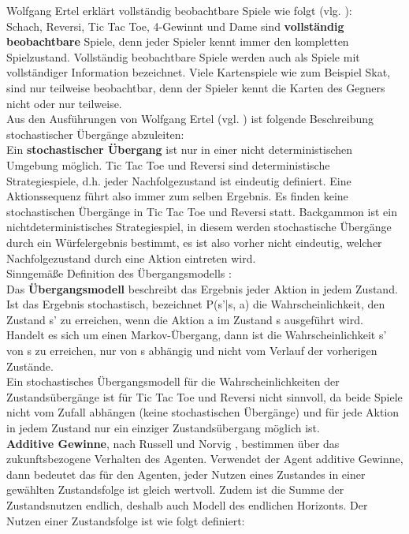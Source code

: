 Wolfgang Ertel erklärt vollständig beobachtbare Spiele wie folgt (vlg. \cite[114]{Ertel}):\\
Schach, Reversi, Tic Tac Toe, 4-Gewinnt und Dame sind \textbf{vollständig beobachtbare} Spiele, denn jeder Spieler kennt immer den kompletten Spielzustand. Vollständig beobachtbare Spiele werden auch als Spiele mit vollständiger Information bezeichnet. Viele Kartenspiele wie zum Beispiel Skat, sind nur teilweise beobachtbar, denn der Spieler kennt die Karten des Gegners nicht oder nur teilweise.\\

Aus den Ausführungen von Wolfgang Ertel (vgl. \cite[114]{Ertel}) ist folgende Beschreibung stochastischer Übergänge abzuleiten: \\
Ein \textbf{stochastischer Übergang} ist nur in einer nicht deterministischen Umgebung möglich.  Tic Tac Toe und Reversi sind deterministische Strategiespiele, d.h. jeder Nachfolgezustand ist eindeutig definiert. Eine Aktionssequenz führt also immer zum selben Ergebnis. Es finden keine stochastischen Übergänge in Tic Tac Toe und Reversi statt. Backgammon ist ein nichtdeterministisches Strategiespiel, in diesem werden stochastische Übergänge durch ein Würfelergebnis bestimmt, es ist also vorher nicht eindeutig, welcher Nachfolgezustand durch eine Aktion eintreten wird. \\

Sinngemäße Definition des Übergangsmodells \cite[753]{Russell}: \\
Das \textbf{Übergangsmodell} beschreibt das Ergebnis jeder Aktion in jedem Zustand. Ist das Ergebnis stochastisch, bezeichnet P(s'|s, a) die Wahrscheinlichkeit, den Zustand s' zu erreichen, wenn die Aktion a im Zustand s ausgeführt wird. Handelt es sich um einen Markov-Übergang, dann ist die Wahrscheinlichkeit s' von s zu erreichen, nur von s abhängig und nicht vom Verlauf der vorherigen Zustände. \\

Ein stochastisches Übergangsmodell für die Wahrscheinlichkeiten der Zustandsübergänge ist für Tic Tac Toe und Reversi nicht sinnvoll, da beide Spiele nicht vom Zufall abhängen (keine stochastischen Übergänge) und für jede Aktion in jedem Zustand nur ein einziger Zustandsübergang möglich ist. \\

\textbf{Additive Gewinne}, nach Russell und Norvig \cite[756]{Russell}, bestimmen über das zukunftsbezogene Verhalten des Agenten. Verwendet der Agent additive Gewinne, dann bedeutet das für den Agenten, jeder Nutzen eines Zustandes in einer gewählten Zustandsfolge ist gleich wertvoll. Zudem ist die Summe der Zustandsnutzen endlich, deshalb auch Modell des endlichen Horizonts. Der Nutzen einer Zustandsfolge ist wie folgt definiert: \\

